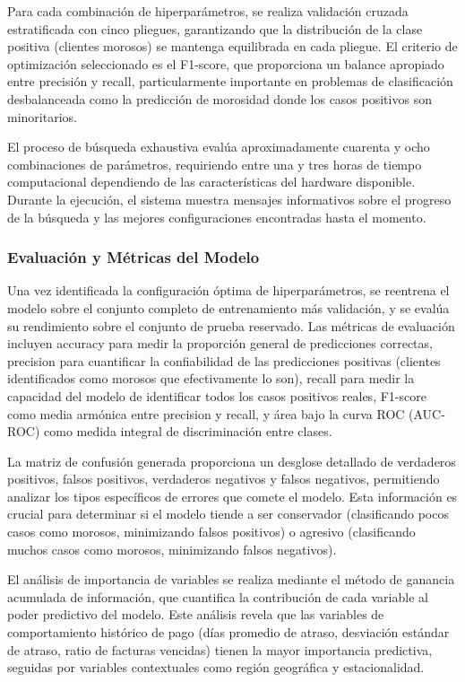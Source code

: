 Para cada combinación de hiperparámetros, se realiza validación cruzada estratificada con cinco pliegues, garantizando que la distribución de la clase positiva (clientes morosos) se mantenga equilibrada en cada pliegue. El criterio de optimización seleccionado es el F1-score, que proporciona un balance apropiado entre precisión y recall, particularmente importante en problemas de clasificación desbalanceada como la predicción de morosidad donde los casos positivos son minoritarios.

El proceso de búsqueda exhaustiva evalúa aproximadamente cuarenta y ocho combinaciones de parámetros, requiriendo entre una y tres horas de tiempo computacional dependiendo de las características del hardware disponible. Durante la ejecución, el sistema muestra mensajes informativos sobre el progreso de la búsqueda y las mejores configuraciones encontradas hasta el momento.

\subsubsection{Evaluación y Métricas del Modelo}

Una vez identificada la configuración óptima de hiperparámetros, se reentrena el modelo sobre el conjunto completo de entrenamiento más validación, y se evalúa su rendimiento sobre el conjunto de prueba reservado. Las métricas de evaluación incluyen accuracy para medir la proporción general de predicciones correctas, precision para cuantificar la confiabilidad de las predicciones positivas (clientes identificados como morosos que efectivamente lo son), recall para medir la capacidad del modelo de identificar todos los casos positivos reales, F1-score como media armónica entre precision y recall, y área bajo la curva ROC (AUC-ROC) como medida integral de discriminación entre clases.

La matriz de confusión generada proporciona un desglose detallado de verdaderos positivos, falsos positivos, verdaderos negativos y falsos negativos, permitiendo analizar los tipos específicos de errores que comete el modelo. Esta información es crucial para determinar si el modelo tiende a ser conservador (clasificando pocos casos como morosos, minimizando falsos positivos) o agresivo (clasificando muchos casos como morosos, minimizando falsos negativos).

El análisis de importancia de variables se realiza mediante el método de ganancia acumulada de información, que cuantifica la contribución de cada variable al poder predictivo del modelo. Este análisis revela que las variables de comportamiento histórico de pago (días promedio de atraso, desviación estándar de atraso, ratio de facturas vencidas) tienen la mayor importancia predictiva, seguidas por variables contextuales como región geográfica y estacionalidad.


